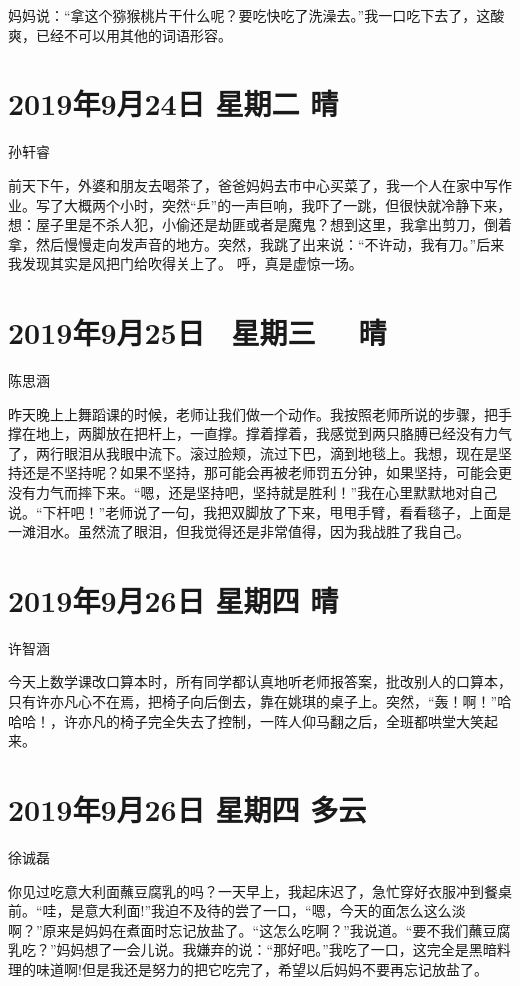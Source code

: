 妈妈说：``拿这个猕猴桃片干什么呢？要吃快吃了洗澡去。''我一口吃下去了，这酸爽，已经不可以用其他的词语形容。

\section{2019年9月24日 星期二 晴}

孙轩睿

前天下午，外婆和朋友去喝茶了，爸爸妈妈去市中心买菜了，我一个人在家中写作业。写了大概两个小时，突然``乒''的一声巨响，我吓了一跳，但很快就冷静下来，想：屋子里是不杀人犯，小偷还是劫匪或者是魔鬼？想到这里，我拿出剪刀，倒着拿，然后慢慢走向发声音的地方。突然，我跳了出来说：``不许动，我有刀。''后来我发现其实是风把门给吹得关上了。
呼，真是虚惊一场。

\section{2019年9月25日~ 星期三~~ 晴}

陈思涵

昨天晚上上舞蹈课的时候，老师让我们做一个动作。我按照老师所说的步骤，把手撑在地上，两脚放在把杆上，一直撑。撑着撑着，我感觉到两只胳膊已经没有力气了，两行眼泪从我眼中流下。滚过脸颊，流过下巴，滴到地毯上。我想，现在是坚持还是不坚持呢？如果不坚持，那可能会再被老师罚五分钟，如果坚持，可能会更没有力气而摔下来。``嗯，还是坚持吧，坚持就是胜利！''我在心里默默地对自己说。``下杆吧！''老师说了一句，我把双脚放了下来，甩甩手臂，看看毯子，上面是一滩泪水。虽然流了眼泪，但我觉得还是非常值得，因为我战胜了我自己。

\section{2019年9月26日 星期四 晴}

许智涵

今天上数学课改口算本时，所有同学都认真地听老师报答案，批改别人的口算本，只有许亦凡心不在焉，把椅子向后倒去，靠在姚琪的桌子上。突然，``轰！啊！''哈哈哈！，许亦凡的椅子完全失去了控制，一阵人仰马翻之后，全班都哄堂大笑起来。

\section{2019年9月26日 星期四 多云}

徐诚磊

你见过吃意大利面蘸豆腐乳的吗？一天早上，我起床迟了，急忙穿好衣服冲到餐桌前。``哇，是意大利面!''我迫不及待的尝了一口，``嗯，今天的面怎么这么淡啊？''原来是妈妈在煮面时忘记放盐了。``这怎么吃啊？''我说道。``要不我们蘸豆腐乳吃？''妈妈想了一会儿说。我嫌弃的说：``那好吧。''我吃了一口，这完全是黑暗料理的味道啊!但是我还是努力的把它吃完了，希望以后妈妈不要再忘记放盐了。

